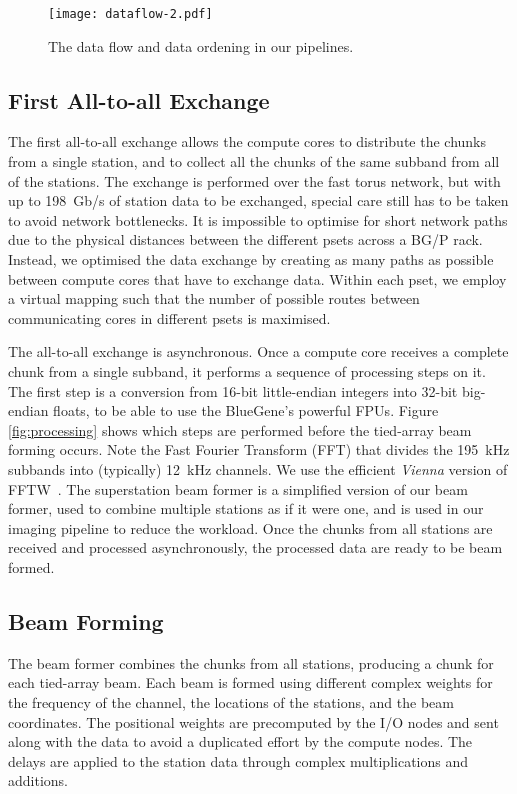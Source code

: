 \documentclass{llncs}
\begin{document}
\begin{figure}[ht]
\center
\texttt{[image: dataflow-2.pdf]}
\caption{The data flow and data ordening in our pipelines.}
\label{fig:dataflow}
\end{figure}

\subsection{First All-to-all Exchange}

The first all-to-all exchange allows the compute cores to distribute the chunks from a single station, and to collect all the chunks of the same subband from all of the stations. The exchange is performed over the fast torus network, but with up to 198~Gb/s of station data to be exchanged, special care still has to be taken to avoid network bottlenecks. It is impossible to optimise for short network paths due to the physical distances between the different psets across a BG/P rack. Instead, we optimised the data exchange by creating as many paths as possible between compute cores that have to exchange data. Within each pset, we employ a virtual mapping such that the number of possible routes between communicating cores in different psets is maximised.

The all-to-all exchange is asynchronous. Once a compute core receives a complete chunk from a single subband, it performs a sequence of processing steps on it. The first step is a conversion from 16-bit little-endian integers into 32-bit big-endian floats, to be able to use the BlueGene's powerful FPUs. Figure \ref{fig:processing} shows which steps are performed before the tied-array beam forming occurs. Note the Fast Fourier Transform (FFT) that divides the 195~kHz subbands into (typically) 12~kHz channels. We use the efficient \emph{Vienna} version of FFTW~\cite{Lorenz:05}. The superstation beam former is a simplified version of our beam former, used to combine multiple stations as if it were one, and is used in our imaging pipeline to reduce the workload. Once the chunks from all stations are received and processed asynchronously, the processed data are ready to be beam formed.

\subsection{Beam Forming}

The beam former combines the chunks from all stations, producing a chunk for each tied-array beam. Each beam is formed using different complex weights for the frequency of the channel, the locations of the stations, and the beam coordinates. The positional weights are precomputed by the I/O nodes and sent along with the data to avoid a duplicated effort by the compute nodes. The delays are applied to the station data through complex multiplications and additions.
\end{document}
